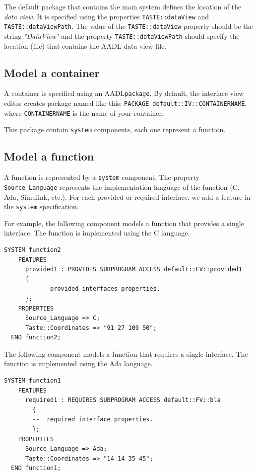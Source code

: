 \documentclass[11pt]{book}
\newcommand{\Concept}[1]{#1\xspace}
\newcommand{\aadl}{\Concept{AADL}}
\begin{document}
      The default package that contains the main system defines the location of
      the \textit{data view}. It is specified using the properties
      \texttt{TASTE::dataView} and \texttt{TASTE::dataViewPath}. The value of
      the \texttt{TASTE::dataView} property should be the string
      \textit{"DataView"} and the property \texttt{TASTE::dataViewPath} should
      specify the location (file) that contains the AADL data view file.


      \subsection{Model a container}
      A container is specified using an \aadl \texttt{package}. By default, the
      interface view editor creates package named like this: \texttt{PACKAGE
      default::IV::CONTAINERNAME}, where \texttt{CONTAINERNAME} is the name of
      your container.

      This package contain \texttt{system} components, each one represent a
      function.

      \subsection{Model a function}
      A function is represented by a \texttt{system} component. The property
      \texttt{Source\_Language} represents the implementation language of the
      function (C, Ada, Simulink, etc.).
      For each provided or required interface, we add a feature in the
      \texttt{system} specification.
      
      
      For example, the following component models
      a function that provides a single interface. The function is implemented
      using the C language.

      \begin{lstlisting}[language=aadl]
  SYSTEM function2
    FEATURES
      provided1 : PROVIDES SUBPROGRAM ACCESS default::FV::provided1
      {
         --  provided interfaces properties.
      };
    PROPERTIES
      Source_Language => C;
      Taste::Coordinates => "91 27 109 50";
  END function2;
      \end{lstlisting}

 
      The following component models
      a function that requires a single interface. The function is implemented
      using the Ada language.

      \begin{lstlisting}[language=aadl]
  SYSTEM function1
    FEATURES
      required1 : REQUIRES SUBPROGRAM ACCESS default::FV::bla
        { 
        --  required interface properties.
        };
    PROPERTIES
      Source_Language => Ada;
      Taste::Coordinates => "14 14 35 45";
  END function1;
      \end{lstlisting}
\end{document}
